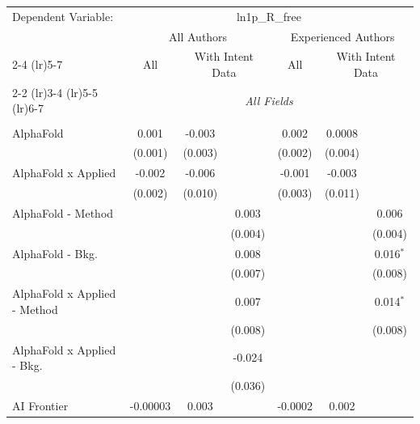 \begingroup
\centering
\begin{tabular}{lcccccc}
   \tabularnewline \midrule \midrule
   Dependent Variable: & \multicolumn{6}{c}{ln1p\_R\_free}\\
 & \multicolumn{3}{c}{All Authors} & \multicolumn{3}{c}{Experienced Authors} \\
\cmidrule(lr){2-4} \cmidrule(lr){5-7}
 & \multicolumn{1}{c}{All} & \multicolumn{2}{c}{With Intent Data} & \multicolumn{1}{c}{All} & \multicolumn{2}{c}{With Intent Data} \\
\cmidrule(lr){2-2} \cmidrule(lr){3-4} \cmidrule(lr){5-5} \cmidrule(lr){6-7}
 & \multicolumn{6}{c}{\textit{All Fields}} \\ \\
   AlphaFold                      & 0.001       & -0.003  &               & 0.002        & 0.0008  &   \\   
                                  & (0.001)     & (0.003) &               & (0.002)      & (0.004) &   \\   
   AlphaFold x Applied            & -0.002      & -0.006  &               & -0.001       & -0.003  &   \\   
                                  & (0.002)     & (0.010) &               & (0.003)      & (0.011) &   \\   
   AlphaFold - Method             &             &         & 0.003         &              &         & 0.006\\   
                                  &             &         & (0.004)       &              &         & (0.004)\\   
   AlphaFold - Bkg.               &             &         & 0.008         &              &         & 0.016$^{*}$\\   
                                  &             &         & (0.007)       &              &         & (0.008)\\   
   AlphaFold x Applied - Method   &             &         & 0.007         &              &         & 0.014$^{*}$\\   
                                  &             &         & (0.008)       &              &         & (0.008)\\   
   AlphaFold x Applied - Bkg.     &             &         & -0.024        &              &         &   \\   
                                  &             &         & (0.036)       &              &         &   \\   
   AI Frontier                    & -0.00003    & 0.003   &               & -0.0002      & 0.002   &   \\   

\end{tabular}
